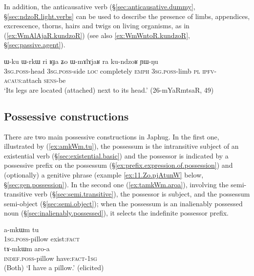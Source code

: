 In addition, the anticausative  verb  (§\ref{sec:anticausative.dummy}, §\ref{sec:ndzoR.light.verbs} can be used to describe the presence of limbs, appendices, excrescence, thorns, hairs and twigs on living organisms, as in (\ref{ex:WmAlAjaR.kundzoR}) (see also \ref{ex:WmWntoR.kundzoR}, §\ref{sec:passive.agent}).

\begin{exe}
\ex \label{ex:WmAlAjaR.kundzoR}
\gll ɯ-ku ɯ-rkɯ ri ʁɟa ʑo ɯ-mɤlɤjaʁ ra ku-ndzoʁ ɲɯ-ŋu \\
\textsc{3sg}.\textsc{poss}-head \textsc{3sg}.\textsc{poss}-side \textsc{loc} completely \textsc{emph} \textsc{3sg}.\textsc{poss}-limb \textsc{pl} \textsc{ipfv}-\textsc{acaus}:attach \textsc{sens}-be \\
\glt `Its legs are located (attached) next to its head.' (26-mYaRmtsaR, 49)
\end{exe}

\subsection{Possessive constructions} \label{sec:possessive.constructions}
There are two main possessive constructions in Japhug. In the first one, illustrated by (\ref{ex:amkWm.tu}), the possessum is the intransitive subject of an existential verb (§\ref{sec:existential.basic}) and the possessor is indicated by a possessive prefix on the possessum (§\ref{ex:prefix.expression.of.possession}) and (optionally) a genitive phrase (example \ref{ex:11.Zo.pjAtunW} below, §\ref{sec:gen.possession}). In the second one (\ref{ex:tamkWm.aroa}), involving the semi-transitive verb   (§\ref{sec:semi.transitive}), the possessor is subject, and the possessum semi-object (§\ref{sec:semi.object}); when the possessum is an inalienably possessed noun (§\ref{sec:inalienably.possessed}), it selects the indefinite possessor prefix. 

\begin{exe}
\ex \label{ex:have.pillow}
\begin{xlist}
\ex \label{ex:amkWm.tu}
\gll a-mkɯm tu \\
\textsc{1sg}.\textsc{poss}-pillow exist:\textsc{fact} \\
\ex \label{ex:tamkWm.aroa}
\gll tɤ-mkɯm aro-a \\
\textsc{indef}.\textsc{poss}-pillow have:\textsc{fact}-\textsc{1sg} \\
\glt (Both) `I have a pillow.' (elicited)
\end{xlist}
\end{exe}
 
